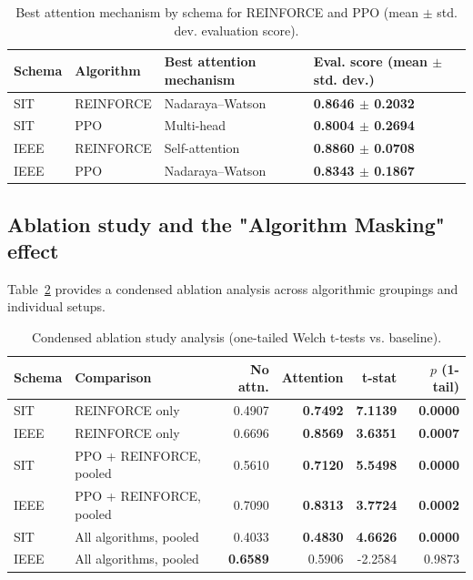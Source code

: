 \documentclass[sn-basic]{sn-jnl}%
\begin{document}
\begin{table}[htbp]
\centering
	\caption{Best attention mechanism by schema for \textsc{REINFORCE} and \textsc{PPO} (mean $\pm$ std. dev. evaluation score).}
	\label{tab:best_mech_ppo_rf}
	\begin{tabular}{l l l l}
	\toprule
	\textbf{Schema} & \textbf{Algorithm} & \textbf{Best attention mechanism} & \textbf{Eval. score (mean $\pm$ std. dev.)}\\
	\midrule
	SIT & \textsc{REINFORCE} & Nadaraya--Watson & \textbf{0.8646 $\pm$ 0.2032}\\
	SIT & \textsc{PPO} & Multi-head & \textbf{0.8004 $\pm$ 0.2694}\\
	IEEE & \textsc{REINFORCE} & Self-attention & \textbf{0.8860 $\pm$ 0.0708}\\
	IEEE & \textsc{PPO} & Nadaraya--Watson & \textbf{0.8343 $\pm$ 0.1867}\\
	\bottomrule
	\end{tabular}
\end{table}

\subsection{Ablation study and the "Algorithm Masking" effect} \label{sec:ablation_results}

Table~\ref{tab:ablation_condensed} provides a condensed ablation analysis across algorithmic groupings and individual setups.

\begin{table}[htbp]
	\centering
	\caption{Condensed ablation study analysis (one-tailed Welch t-tests vs. baseline).}
	\label{tab:ablation_condensed}
	\begin{tabular}{l l r r r r}
		\toprule
		\textbf{Schema} & \textbf{Comparison} & \textbf{No attn.} & \textbf{Attention} & \textbf{t-stat} & \textbf{$p$ (1-tail)}\\
		\midrule
		SIT & \textsc{REINFORCE} only & 0.4907 & \textbf{0.7492} & \textbf{7.1139} & \textbf{0.0000}\\
		IEEE & \textsc{REINFORCE} only & 0.6696 & \textbf{0.8569} & \textbf{3.6351} & \textbf{0.0007}\\
		SIT & PPO + \textsc{REINFORCE}, pooled & 0.5610 & \textbf{0.7120} & \textbf{5.5498} & \textbf{0.0000}\\
		IEEE & PPO + \textsc{REINFORCE}, pooled & 0.7090 & \textbf{0.8313} & \textbf{3.7724} & \textbf{0.0002}\\
		SIT & All algorithms, pooled & 0.4033 & \textbf{0.4830} & \textbf{4.6626} & \textbf{0.0000}\\
		IEEE & All algorithms, pooled & \textbf{0.6589} & 0.5906 & -2.2584 & 0.9873\\
		\bottomrule
	\end{tabular}
\end{table}
\end{document}
